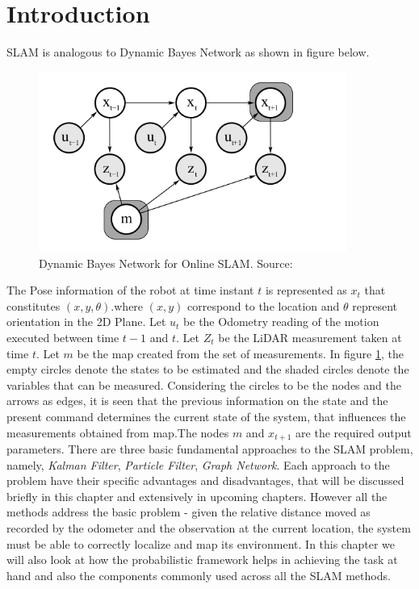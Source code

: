 \section*{Introduction}
    SLAM is analogous to Dynamic Bayes Network as shown in figure below. 
    \begin{figure}[h] 
        \includegraphics[width=0.9\textwidth]{images/DBN_Online.png}
        \caption{Dynamic Bayes Network for Online SLAM. Source:\cite{Thrun98aprobabilistic}}
        \label{fig:DBNOn}
    \end{figure}
The Pose information of the robot at time instant $t$ is represented as $x_t$ that constitutes $(x,y,\theta)$.where $(x,y)$ correspond to the location and $\theta$ represent orientation in the 2D Plane. Let $u_t$ be the Odometry reading of the motion executed between time $t-1$ and $t$. Let $Z_t$ be the LiDAR measurement taken at time $t$. Let $m$ be the map created from the set of measurements. In figure \ref{fig:DBNOn}, the empty circles denote the states to be estimated and the shaded circles denote the variables that can be measured. Considering the circles to be the nodes and the arrows as edges, it is seen that the previous information on the state and the present command determines the current state of the system, that influences the measurements obtained from map.The nodes $m$ and $x_{t+1}$ are the required output parameters. There are three basic fundamental approaches to the SLAM problem, namely, \textit{Kalman Filter}, \textit{Particle Filter}, \textit{Graph Network}. Each approach to the problem have their specific advantages and disadvantages, that will be discussed briefly in this chapter and extensively in upcoming chapters. However all the methods address the basic problem - given the relative distance moved as recorded by the odometer and the observation at the current location, the system must be able to correctly localize and map its environment. In this chapter we will also look at how the probabilistic framework helps in achieving the task at hand and also the components commonly used across all the SLAM methods.
